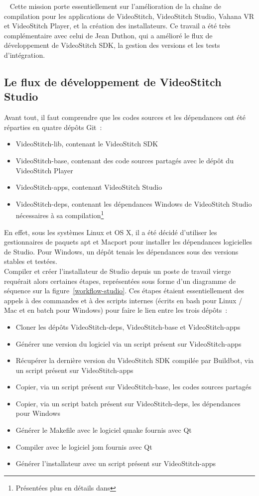 \ \newline
Cette mission porte essentiellement sur l'amélioration de la chaîne de compilation
pour les applications de VideoStitch, VideoStitch Studio, Vahana VR et VideoStitch
Player, et la création des installateurs. Ce travail a été très complémentaire avec
celui de Jean Duthon, qui a amélioré le flux de développement de VideoStitch SDK,
la gestion des versions et les tests d'intégration.

\subsection{Le flux de développement de VideoStitch Studio} 
Avant tout, il faut comprendre que les codes sources et les dépendances ont été réparties 
en quatre dépôts Git~: 
\begin{itemize}
  \item VideoStitch-lib, contenant le VideoStitch SDK
  \item VideoStitch-base, contenant des code sources partagés avec le dépôt du VideoStitch Player
  \item VideoStitch-apps, contenant VideoStitch Studio
  \item VideoStitch-deps, contenant les dépendances Windows de VideoStitch Studio 
  nécessaires à sa compilation\footnote{Présentées plus en détails dans }
\end{itemize}
En effet, sous les systèmes Linux et OS X, il a été décidé d'utiliser les gestionnaires
de paquets apt et Macport pour installer les dépendances logicielles de Studio. Pour
Windows, un dépôt tenais les dépendances sous des versions stables et testées.\\
\newline
Compiler et créer l'installateur de Studio depuis un poste de travail vierge requérait alors
certaines étapes, représentées sous forme d'un diagramme de séquence sur la figure~\ref{workflow-studio}.
Ces étapes étaient essentiellement des appels à des commandes et à des scripts internes
(écrits en bash pour Linux / Mac et en batch pour Windows) pour faire le lien entre les trois dépôts~:
\begin{itemize}
  \item Cloner les dépôts VideoStitch-deps, VideoStitch-base et VideoStitch-apps
  \item Générer une version du logiciel via un script présent sur VideoStitch-apps
  \item Récupérer la dernière version du VideoStitch SDK compilée par Buildbot, 
  via un script présent sur VideoStitch-apps
  \item Copier, via un script présent sur VideoStitch-base, les codes sources partagés
  \item Copier, via un script batch présent sur VideoStitch-deps, les dépendances pour Windows
  \item Générer le Makefile avec le logiciel qmake fournis avec Qt
  \item Compiler avec le logiciel jom fournis avec Qt
  \item Générer l'installateur avec un script présent sur VideoStitch-apps
\end{itemize}
